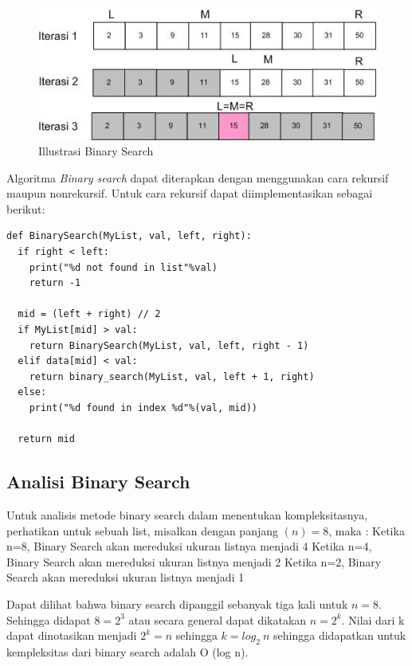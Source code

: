 \documentclass[12pt]{book}%
\begin{document}
\begin{figure}[htbp]
\begin{center}
	\includegraphics[scale=0.8]{fig/sunario-3/BinarySearch.jpg}%
	\caption{Illustrasi Binary Search}%
	\label{fig:Binary Search Ilustration}%
\end{center}
\end{figure}

\newpage{}
Algoritma \textit{Binary search} dapat diterapkan dengan menggunakan cara rekursif maupun nonrekursif. Untuk cara rekursif dapat diimplementasikan sebagai berikut:

\lstset{language=Python}
\label{lst:BinarySearch}
\begin{lstlisting}[frame=single]
def BinarySearch(MyList, val, left, right):
  if right < left:
    print("%d not found in list"%val)
    return -1
	
  mid = (left + right) // 2
  if MyList[mid] > val:
    return BinarySearch(MyList, val, left, right - 1)
  elif data[mid] < val:
    return binary_search(MyList, val, left + 1, right)
  else:
    print("%d found in index %d"%(val, mid))
  
  return mid
\end{lstlisting}

\subsection{Analisi Binary Search}
Untuk analisis metode binary search dalam menentukan kompleksitasnya, perhatikan untuk sebuah list, misalkan dengan panjang $(n) = 8$, maka :\newline
Ketika n=8, Binary Search akan mereduksi ukuran listnya menjadi 4\newline
Ketika n=4, Binary Search akan mereduksi ukuran listnya menjadi 2\newline
Ketika n=2, Binary Search akan mereduksi ukuran listnya menjadi 1\newline

Dapat dilihat bahwa binary search dipanggil sebanyak tiga kali untuk $n = 8$. Sehingga didapat $8 = 2^{3}$ atau secara general dapat dikatakan $n = 2^{k}$.  Nilai dari k dapat dinotasikan menjadi $2^{k} = n$ sehingga $k = log_2\ n$ sehingga didapatkan untuk kempleksitas dari binary search adalah  O (log n).
\end{document}
